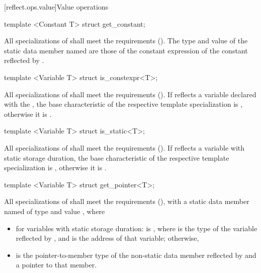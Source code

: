 [reflect.ops.value]{Value operations}

\begin{std.txt}\color{addclr}

\begin{itemdecl}
template <Constant T> struct get_constant;
\end{itemdecl}

\begin{itemdescr}
\pnum
All specializations of  shall meet the  requirements (). The type and value of the static data member named  are those of the constant expression of the constant reflected by .

\end{itemdescr}

\begin{itemdecl}
template <Variable T> struct is_constexpr<T>;
\end{itemdecl}

\begin{itemdescr}
\pnum
All specializations of  shall meet the  requirements (). If  reflects a variable declared with the  , the base characteristic of the respective template specialization is , otherwise it is .
\end{itemdescr}

\begin{itemdecl}
template <Variable T> struct is_static<T>;
\end{itemdecl}

\begin{itemdescr}
\pnum
All specializations of  shall meet the  requirements (). If  reflects a variable with static storage duration, the base characteristic of the respective template specialization is , otherwise it is .
\end{itemdescr}

\begin{itemdecl}
template <Variable T> struct get_pointer<T>;
\end{itemdecl}

\begin{itemdescr}
\pnum
All specializations of  shall meet the  requirements (), with a static data member named  of type  and value , where
\begin{itemize}
  \item for variables with static storage duration:  is , where  is the type of the variable reflected by , and  is the address of that variable; otherwise,
  \item {} is the pointer-to-member type of the non-static data member reflected by  and  a pointer to that member.
\end{itemize}
\end{itemdescr}
\end{std.txt}

